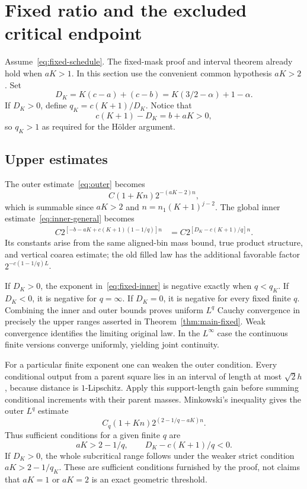 \section{Fixed ratio and the excluded critical endpoint}\label{sec:fixed}
Assume~\eqref{eq:fixed-schedule}. The fixed-mask proof and interval theorem
already hold when $aK>1$. In this section use the convenient common
hypothesis $aK>2$. Set
\begin{equation}\label{eq:DK}
 D_K=K(c-a)+(c-b)=K(3/2-\alpha)+1-\alpha.
\end{equation}
If $D_K>0$, define $q_K=c(K+1)/D_K$. Notice that
\[
 c(K+1)-D_K=b+aK>0,
\]
so $q_K>1$ as required for the H\"older argument.

\subsection{Upper estimates}
The outer estimate~\eqref{eq:outer} becomes
\begin{equation}\label{eq:fixed-outer}
 C(1+Kn)2^{-(aK-2)n},
\end{equation}
which is summable since $aK>2$ and $n=n_1(K+1)^{j-2}$.
The global inner estimate~\eqref{eq:inner-general} becomes
\begin{align}
 C2^{[-b-aK+c(K+1)(1-1/q)]n}
 &=C2^{[D_K-c(K+1)/q]n}.\label{eq:fixed-inner}
\end{align}
Its constants arise from the same aligned-bin mass bound, true product
structure, and vertical coarea estimate; the old filled law has the
additional favorable factor $2^{-c(1-1/q)L}$.

If $D_K>0$, the exponent in~\eqref{eq:fixed-inner} is negative exactly
when $q<q_K$. If $D_K<0$, it is negative for $q=\infty$. If $D_K=0$,
it is negative for every fixed finite $q$. Combining the inner and outer
bounds proves uniform $L^q$ Cauchy convergence in precisely the upper
ranges asserted in Theorem~\ref{thm:main-fixed}. Weak convergence identifies
the limiting original law. In the $L^\infty$ case the continuous finite
versions converge uniformly, yielding joint continuity.

For a particular finite exponent one can weaken the outer condition.
Every conditional output from a parent square lies in an interval of
length at most $\sqrt2h$, because distance is $1$-Lipschitz. Apply this
support-length gain before summing conditional increments with their
parent masses. Minkowski's inequality gives the outer $L^q$ estimate
\begin{equation}\label{eq:improved-fixed-outer}
 C_q(1+Kn)2^{(2-1/q-aK)n}.
\end{equation}
Thus sufficient conditions for a given finite $q$ are
\begin{equation}\label{eq:weaker-fixed}
 aK>2-1/q,\qquad D_K-c(K+1)/q<0.
\end{equation}
If $D_K>0$, the whole subcritical range follows under the weaker strict
condition $aK>2-1/q_K$. These are sufficient conditions furnished by the
proof, not claims that $aK=1$ or $aK=2$ is an exact geometric threshold.

